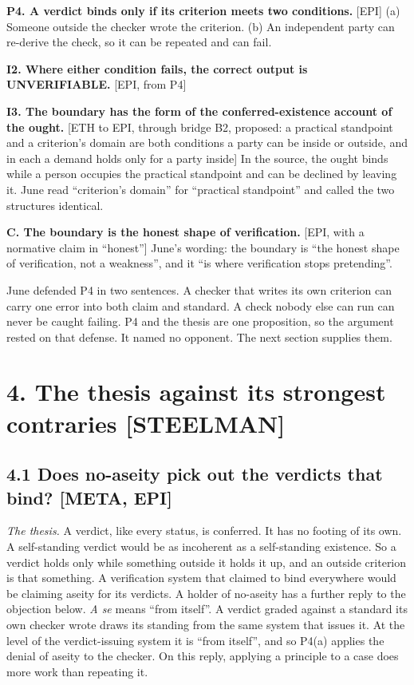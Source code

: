 \documentclass[11pt]{article}
\newcommand{\register}[1]{{\ttfamily\small #1}}
\begin{document}
\textbf{P4. A verdict binds only if its criterion meets two conditions.} [EPI] (a) Someone outside the checker wrote the criterion. (b) An independent party can re-derive the check, so it can be repeated and can fail.

\textbf{I2. Where either condition fails, the correct output is UNVERIFIABLE.} [EPI, from P4]

\textbf{I3. The boundary has the form of the conferred-existence account of the ought.} [ETH to EPI, through bridge B2, proposed: a practical standpoint and a criterion's domain are both conditions a party can be inside or outside, and in each a demand holds only for a party inside] In the source, the ought binds while a person occupies the practical standpoint and can be declined by leaving it. June read ``criterion's domain'' for ``practical standpoint'' and called the two structures identical.

\textbf{C. The boundary is the honest shape of verification.} [EPI, with a normative claim in ``honest''] June's wording: the boundary is ``the honest shape of verification, not a weakness'', and it ``is where verification stops pretending''.

June defended P4 in two sentences. A checker that writes its own criterion can carry one error into both claim and standard. A check nobody else can run can never be caught failing. P4 and the thesis are one proposition, so the argument rested on that defense. It named no opponent. The next section supplies them.

\section*{4. The thesis against its strongest contraries \register{[STEELMAN]}}

\subsection*{4.1 Does no-aseity pick out the verdicts that bind? [META, EPI]}

\emph{The thesis.} A verdict, like every status, is conferred. It has no footing of its own. A self-standing verdict would be as incoherent as a self-standing existence. So a verdict holds only while something outside it holds it up, and an outside criterion is that something. A verification system that claimed to bind everywhere would be claiming aseity for its verdicts. A holder of no-aseity has a further reply to the objection below. \emph{A se} means ``from itself''. A verdict graded against a standard its own checker wrote draws its standing from the same system that issues it. At the level of the verdict-issuing system it is ``from itself'', and so P4(a) applies the denial of aseity to the checker. On this reply, applying a principle to a case does more work than repeating it.
\end{document}
